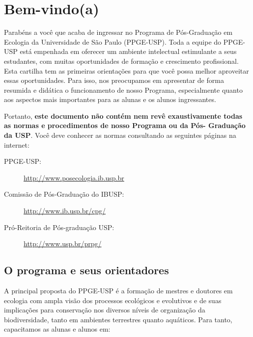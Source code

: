 \documentclass[twoside a4paper 12pt]{report}
\begin{document}
\Large




\pagestyle{fancy}


\chapter{Bem-vindo(a)}
\label{chap:aprest}

Parabéns a você que acaba de ingressar no Programa de Pós-Graduação em Ecologia da Universidade de São Paulo (PPGE-USP). Toda a equipe do PPGE-USP está empenhada em oferecer um ambiente intelectual estimulante a seus estudantes, com muitas oportunidades de formação e crescimento profissional. Esta cartilha tem as primeiras orientações para que você possa melhor aproveitar essas oportunidades. Para isso, nos preocupamos em apresentar de forma resumida e didática o funcionamento de nosso Programa, especialmente quanto aos aspectos mais importantes para as alunas e os alunos ingressantes.

Portanto, \textbf{este documento não contém nem revê exaustivamente
todas as normas e procedimentos de nosso Programa ou da Pós- Graduação
da USP}. Você deve conhecer as normas consultando as seguintes páginas
na internet:

\begin{description}
\item[PPGE-USP:] \url{http://www.posecologia.ib.usp.br}
\item[Comissão de Pós-Graduação do IBUSP:] \url{http://www.ib.usp.br/cpg/}
\item[Pró-Reitoria de Pós-graduação USP:] \url{http://www.usp.br/prpg/}
\end{description}


\section{O programa e seus orientadores}

A principal proposta do PPGE-USP é a formação de mestres e doutores em ecologia com ampla
visão dos processos ecológicos e evolutivos e de suas implicações para
conservação nos diversos níveis de organização da biodiversidade, tanto
em ambientes terrestres quanto aquáticos. Para tanto, capacitamos as
alunas e alunos em:
\end{document}
